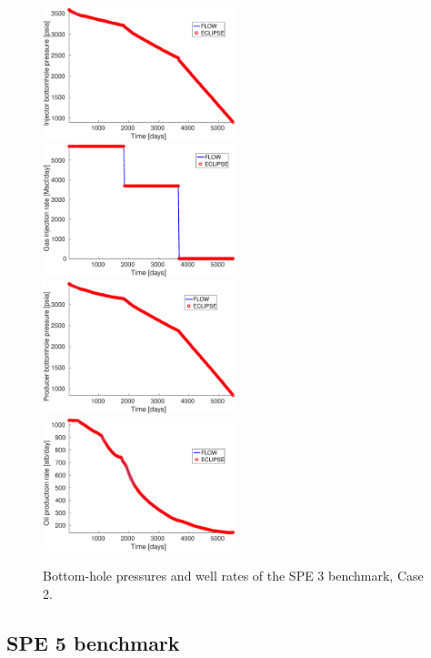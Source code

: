 %
\begin{figure}
  \includegraphics[width=0.5\textwidth]{figures/spe3/spe3_wbhp_inj}\hfill
  \includegraphics[width=0.5\textwidth]{figures/spe3/spe3_wgir}\\
  \includegraphics[width=0.5\textwidth]{figures/spe3/spe3_wbhp_prod}\hfill
  \includegraphics[width=0.5\textwidth]{figures/spe3/spe3_wopr}
\caption{Bottom-hole pressures and well rates of the SPE 3 benchmark, Case 2.}
\label{fig:spe3_results}
\end{figure}

\subsection{SPE 5 benchmark}
\label{sec:spe5}

